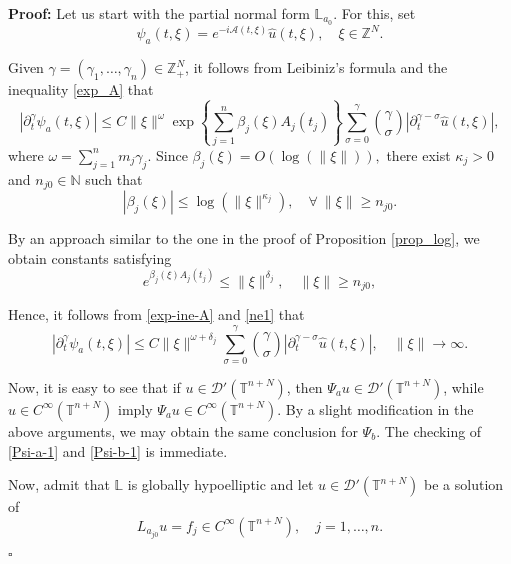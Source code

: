 \documentclass[12pt]{elsarticle}
\numberwithin{equation}{section}
\newenvironment{proof}[1][\noindent \textbf{Proof: }]{#1}{ \hfill $\square$ \vspace{2mm}}
\begin{document}
\begin{proof}
	Let us start with the partial normal form  $\mathbb{L}_{a_0}$. For this,  set
\begin{equation*}
\psi_{a}(t, \xi) = e^{-i \mathcal{A}(t,\xi)}\widehat{u}(t, \xi), \quad \xi \in \mathbb{Z}^N.
\end{equation*}


Given $\gamma = (\gamma_1, \ldots, \gamma_n) \in \mathbb{Z}^{N}_+$, it follows from Leibiniz's formula and the inequality \eqref{exp_A} that
\begin{equation}\label{exp-ine-A}
|\partial_t^\gamma \psi_{a}(t, \xi)| \leq C \|\xi\|^{\omega}  
\exp \left\{\sum_{j=1}^{n}\beta_j(\xi)A_j(t_j) \right\}
\sum_{\sigma = 0}^{\gamma}
\binom{\gamma}{\sigma}
|\partial_t^{\gamma - \sigma} \widehat{u}(t, \xi)|,
\end{equation}
where $\omega = \sum_{j=1}^{n}m_j \gamma_j.$  Since $\beta_j(\xi)=O(\log(\|\xi\|)),$  there exist $\kappa_j>0$ and $n_{j0}\in \mathbb{N}$ such that
\begin{equation}\label{log-estimate-3}
|\beta_j(\xi)| \leq  \log(\|\xi\|^{\kappa_j}), \quad \forall \ \|\xi\|\geq  n_{j0}.
\end{equation}

By an  approach similar to the one in the proof of Proposition \ref{prop_log}, we obtain  constants satisfying  
\begin{equation}\label{ne1}
e^{\beta_j(\xi) A_j(t_j)} \leq  \|\xi\|^{\delta_{j}}, \quad \|\xi\|\geq n_{j0},
\end{equation}

Hence, it follows from \eqref{exp-ine-A} and  \eqref{ne1} that
\begin{equation*}
|\partial_t^\gamma \psi_{a}(t, \xi)| \leq C \|\xi\|^{\omega + \delta_{j}}  
\sum_{\sigma = 0}^{\gamma}\binom{\gamma}{\sigma}
|\partial_t^{\gamma - \sigma} \widehat{u}(t, \xi)|, \quad \|\xi\| \to \infty.
\end{equation*}

Now, it is easy to see that if $u \in \mathcal{D}'(\mathbb{T}^{n+N})$, then  
$\Psi_a u \in \mathcal{D}'(\mathbb{T}^{n+N})$, while 
$u \in C^{\infty}(\mathbb{T}^{n+N})$ imply $\Psi_a u \in C^{\infty}(\mathbb{T}^{n+N}) $. By a slight modification in the above arguments, we may obtain the same conclusion for $\Psi_b$. The checking of \eqref{Psi-a-1} and \eqref{Psi-b-1} is immediate.


Now, admit that $\mathbb{L}$  is globally hypoelliptic and  let $u \in \mathcal{D}'(\mathbb{T}^{n+N})$ be a solution of
$$
L_{a_{j0}} u = f_j \in C^{\infty}(\mathbb{T}^{n+N}), \quad j = 1, \ldots, n.
$$


\end{proof}
\end{document}

